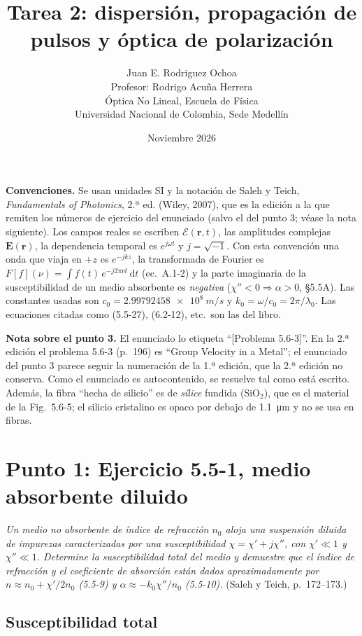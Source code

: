\documentclass{article}
\title{Tarea 2: dispersión, propagación de pulsos y óptica de polarización}
\author{Juan E. Rodriguez Ochoa\\
Profesor: Rodrigo Acuña Herrera\\
Óptica No Lineal, Escuela de Física\\
Universidad Nacional de Colombia, Sede Medellín}
\date{Noviembre 2026}
\newcommand{\Ec}{\boldsymbol{\mathcal{E}}}
\newcommand{\dd}{\,\mathrm{d}}
\newcommand{\Ev}{\mathbf{E}}
\newcommand{\um}{\si{\micro\metre}}
\begin{document}
\maketitle

\noindent\textbf{Convenciones.} Se usan unidades SI y la notación de Saleh y Teich,
\emph{Fundamentals of Photonics}, 2.ª ed. (Wiley, 2007), que es la edición a la que remiten
los números de ejercicio del enunciado (salvo el del punto 3; véase la nota siguiente). Los campos reales se escriben $\Ec(\mathbf r,t)$, las
amplitudes complejas $\Ev(\mathbf r)$, la dependencia temporal es $e^{j\omega t}$ y
$j=\sqrt{-1}$. Con esta convención una onda que viaja en $+z$ es $e^{-jkz}$, la
transformada de Fourier es $F[f](\nu)=\int f(t)\,e^{-j2\pi\nu t}\dd t$ (ec.~A.1-2) y la parte
imaginaria de la susceptibilidad de un medio absorbente es \emph{negativa}
($\chi''<0\Rightarrow\alpha>0$, §5.5A). Las constantes usadas son $c_0=\SI{2.99792458e8}{m/s}$ y
$k_0=\omega/c_0=2\pi/\lambda_0$. Las ecuaciones citadas como (5.5-27), (6.2-12), etc.\ son las del
libro.

\medskip
\noindent\textbf{Nota sobre el punto 3.} El enunciado lo etiqueta ``[Problema 5.6-3]''. En la
2.ª edición el problema 5.6-3 (p.~196) es ``Group Velocity in a Metal''; el enunciado del punto 3
parece seguir la numeración de la 1.ª edición, que la 2.ª edición no conserva. Como el
enunciado es autocontenido, se resuelve tal como está escrito. Además, la fibra ``hecha de
silicio'' es de \emph{sílice} fundida (SiO$_2$), que es el material de la Fig.~5.6-5; el silicio
cristalino es opaco por debajo de \SI{1.1}{\um} y no se usa en fibras.

\section{Punto 1: Ejercicio 5.5-1, medio absorbente diluido}

\emph{Un medio no absorbente de índice de refracción $n_0$ aloja una suspensión diluida de
impurezas caracterizadas por una susceptibilidad $\chi=\chi'+j\chi''$, con $\chi'\ll1$ y
$\chi''\ll1$. Determine la susceptibilidad total del medio y demuestre que el índice de
refracción y el coeficiente de absorción están dados aproximadamente por
$n\approx n_0+\chi'/2n_0$ (5.5-9) y $\alpha\approx-k_0\chi''/n_0$ (5.5-10).} (Saleh y Teich,
p.~172--173.)

\subsection*{Susceptibilidad total}
\end{document}
